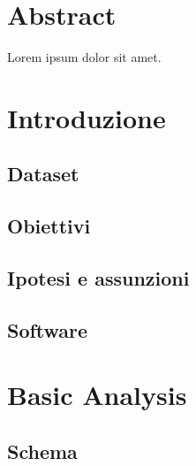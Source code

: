 \documentclass[hidelinks, 12pt]{article}
\begin{document}


\null{}
\section*{\centering Abstract}

Lorem ipsum dolor sit amet.

 \null

\clearpage



\tableofcontents
\clearpage
\listoffigures
\listoftables
\pagebreak




\section{Introduzione}

\subsection{Dataset}

\subsection{Obiettivi}

\subsection{Ipotesi e assunzioni}

\subsection{Software}



\clearpage



\section{Basic Analysis}

\subsection{Schema}
\end{document}
